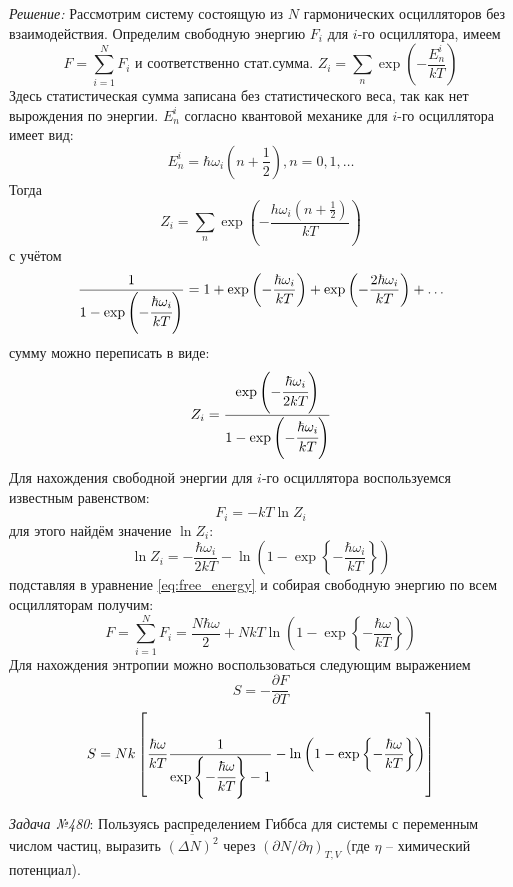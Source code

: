\documentclass[14pt,final,titlepage,pscyr]{hedwork}
\begin{document}
\emph{Решение:} Рассмотрим систему состоящую из \( N \) гармонических 
осцилляторов без взаимодействия. Определим свободную энергию \( F_i \) для 
\( i \)-го осциллятора, имеем
\[
	F = \sum\limits_{i=1}^{N} F_i \text{ и соответственно стат.сумма. }
	Z_i = \sum\limits_{n} \exp\left( -\frac{E_n^i}{kT} \right)
\]
Здесь статистическая сумма записана без статистического веса, так как нет 
вырождения по энергии. \( E_n^i \) согласно квантовой механике для 
\( i \)-го осциллятора имеет вид:
\[
	E^i_n = \hbar\omega_i \left( n + \frac{1}{2} \right), n = 0, 1, \ldots
\]
Тогда
\[
	Z_i = \sum\limits_n \exp\left( -\frac{h\omega_i
		\left( n + \frac{1}{2} \right)}{kT} \right)
\]
с учётом
\[
	\frac{1}{1-\exp\left( -\cfrac{\hbar\omega_i}{kT} \right)} = 1 + 
		\exp\left( -\frac{\hbar\omega_i}{kT} \right) + 
		\exp\left( -\frac{2\hbar\omega_i}{kT} \right) + \ldots
\]
сумму можно переписать в виде:
\[
	Z_i = \frac{\exp\left( -\cfrac{\hbar\omega_i}{2kT} \right)}
		{1-\exp\left( -\cfrac{\hbar\omega_i}{kT} \right)}
\]
Для нахождения свободной энергии для \( i \)-го осциллятора воспользуемся 
известным равенством:
\begin{equation}
	F_i = -kT\ln Z_i
	\label{eq:free_energy}
\end{equation}
для этого найдём значение \( \ln Z_i \):
\[
	\ln Z_i = -\frac{\hbar\omega_i}{2kT} - \ln\left( 1-\exp\left\{ 
		-\frac{\hbar\omega_i}{kT}\right\}\right)
\]
подставляя в уравнение \eqref{eq:free_energy} и собирая свободную энергию 
по всем осцилляторам получим:
\[
	F = \sum\limits_{i=1}^{N} F_i = \frac{N\hbar\omega}{2} + 
		NkT\ln\left( 1-\exp\left\{ -\frac{\hbar\omega}{kT}\right\}\right)
\]
Для нахождения энтропии можно воспользоваться следующим выражением
\[
	S = -\frac{\partial F}{\partial T}
\]
\[
	S = Nk\left[ \frac{\hbar\omega}{kT}
		\frac{1}{\exp\left\{-\cfrac{\hbar\omega}{kT}\right\}-1} - 
		\ln\left( 1-\exp\left\{ -\frac{\hbar\omega}{kT}\right\}\right) 
	\right]
\]

\newpage

\emph{Задача №480}: Пользуясь распределением Гиббса для системы с переменным 
числом частиц, выразить \( \overline{(\Delta N)^2} \) через 
\( \left( \partial N / \partial \eta \right)_{T,V} \) (где \( \eta \) -- 
химический потенциал).
\end{document}
